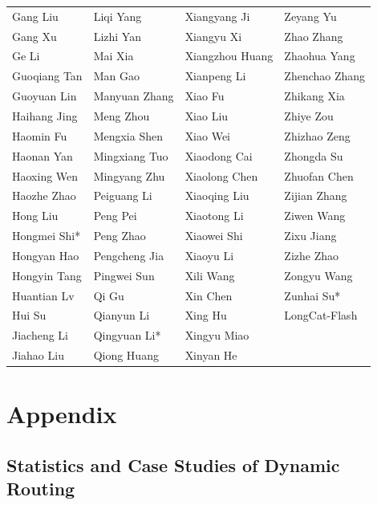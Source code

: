 \documentclass{article}
\begin{document}
\begin{tabular}{p{}p{}p{}p{}}
Gang Liu & Liqi Yang & Xiangyang Ji & Zeyang Yu \\
Gang Xu & Lizhi Yan & Xiangyu Xi & Zhao Zhang \\
Ge Li & Mai Xia & Xiangzhou Huang & Zhaohua Yang \\
Guoqiang Tan & Man Gao & Xianpeng Li & Zhenchao Zhang \\
Guoyuan Lin & Manyuan Zhang & Xiao Fu & Zhikang Xia \\
Haihang Jing & Meng Zhou & Xiao Liu & Zhiye Zou \\
Haomin Fu & Mengxia Shen & Xiao Wei & Zhizhao Zeng \\
Haonan Yan & Mingxiang Tuo & Xiaodong Cai & Zhongda Su \\
Haoxing Wen & Mingyang Zhu & Xiaolong Chen & Zhuofan Chen \\
Haozhe Zhao & Peiguang Li & Xiaoqing Liu & Zijian Zhang \\
Hong Liu & Peng Pei & Xiaotong Li & Ziwen Wang \\
Hongmei Shi* & Peng Zhao & Xiaowei Shi & Zixu Jiang \\
Hongyan Hao & Pengcheng Jia & Xiaoyu Li & Zizhe Zhao \\
Hongyin Tang & Pingwei Sun & Xili Wang & Zongyu Wang \\
Huantian Lv & Qi Gu & Xin Chen & Zunhai Su* \\
Hui Su & Qianyun Li & Xing Hu &  LongCat-Flash\\
Jiacheng Li & Qingyuan Li* & Xingyu Miao &  \\
Jiahao Liu & Qiong Huang & Xinyan He &  \\
\end{tabular}



  

\clearpage

\appendix
\section{Appendix}\label{appendix}

\subsection{Statistics and Case Studies of Dynamic Routing}\label{appendix:pretrain_dynamics}
\end{document}
